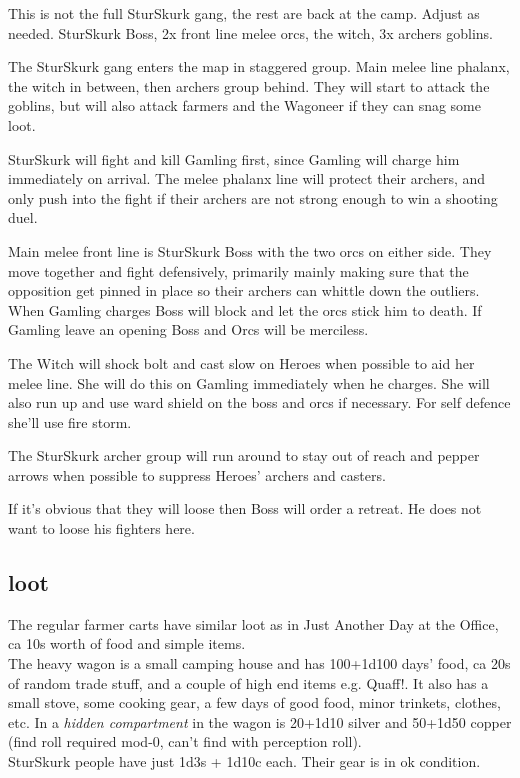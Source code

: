This is not the full SturSkurk gang, the rest are back at the camp. Adjust as needed. SturSkurk Boss, 2x front line melee orcs, the witch, 3x archers goblins.

The SturSkurk gang enters the map in staggered group. Main melee line phalanx, the witch in between, then archers group behind.
They will start to attack the goblins, but will also attack farmers and the Wagoneer if they can snag some loot.

SturSkurk will fight and kill Gamling first, since Gamling will charge him immediately on arrival. The melee phalanx line will protect their archers, and only push into the fight if their archers are not strong enough to win a shooting duel.

Main melee front line is SturSkurk Boss with the two orcs on either side. They move together and fight defensively, primarily mainly making sure that the opposition get pinned in place so their archers can whittle down the outliers. When Gamling charges Boss will block and let the orcs stick him to death. If Gamling leave an opening Boss and Orcs will be merciless.

The Witch will shock bolt and cast slow on Heroes when possible to aid her melee line. She will do this on Gamling immediately when he charges. She will also run up and use ward shield on the boss and orcs if necessary. For self defence she'll use fire storm.

The SturSkurk archer group will run around to stay out of reach and pepper arrows when possible to suppress Heroes' archers and casters.

If it's obvious that they will loose then Boss will order a retreat. He does not want to loose his fighters here.


\subsection*{loot}

The regular farmer carts have similar loot as in Just Another Day at the Office, ca 10s worth of food and simple items.\\
The heavy wagon is a small camping house and has 100+1d100 days' food, ca 20s of random trade stuff, and a couple of high end items e.g. Quaff!. It also has a small stove, some cooking gear, a few days of good food, minor trinkets, clothes, etc. In a \emph{hidden compartment} in the wagon is 20+1d10 silver and 50+1d50 copper (find roll required mod-0, can't find with perception roll).\\
SturSkurk people have just 1d3s + 1d10c each. Their gear is in ok condition.

